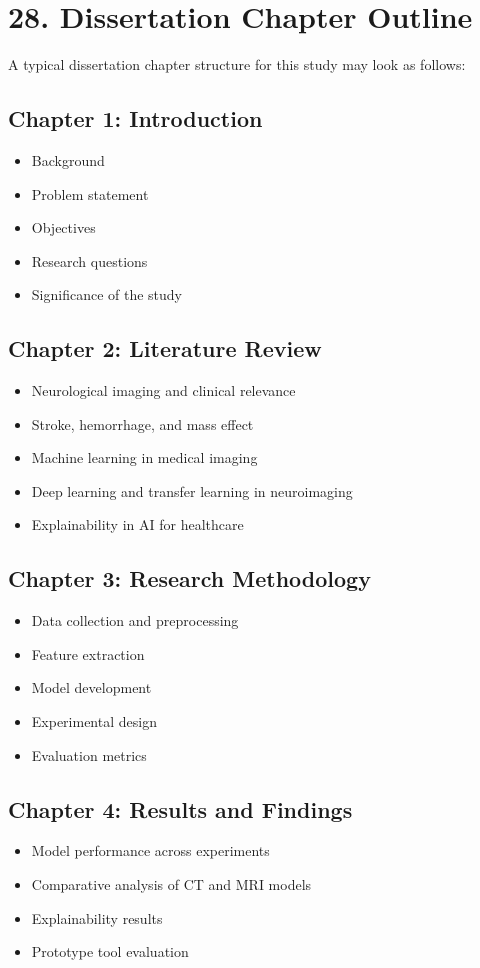 \documentclass[12pt,a4paper]{report}
\begin{document}
\section{28. Dissertation Chapter Outline}

A typical dissertation chapter structure for this study may look as follows:

\subsection{Chapter 1: Introduction}
\begin{itemize}
\item Background
\item Problem statement
\item Objectives
\item Research questions
\item Significance of the study
\end{itemize}

\subsection{Chapter 2: Literature Review}
\begin{itemize}
\item Neurological imaging and clinical relevance
\item Stroke, hemorrhage, and mass effect
\item Machine learning in medical imaging
\item Deep learning and transfer learning in neuroimaging
\item Explainability in AI for healthcare
\end{itemize}

\subsection{Chapter 3: Research Methodology}
\begin{itemize}
\item Data collection and preprocessing
\item Feature extraction
\item Model development
\item Experimental design
\item Evaluation metrics
\end{itemize}

\subsection{Chapter 4: Results and Findings}
\begin{itemize}
\item Model performance across experiments
\item Comparative analysis of CT and MRI models
\item Explainability results
\item Prototype tool evaluation
\end{itemize}
\end{document}
